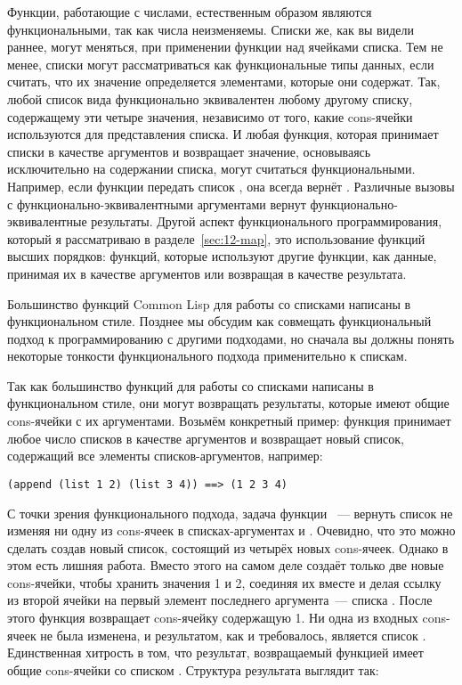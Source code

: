 Функции, работающие с числами, естественным образом являются функциональными, так как числа
неизменяемы. Списки же, как вы видели раннее, могут меняться, при применении функции
 над ячейками списка. Тем не менее, списки могут рассматриваться как
функциональные типы данных, если считать, что их значение определяется элементами, которые
они содержат. Так, любой список вида  функционально эквивалентен любому
другому списку, содержащему эти четыре значения, независимо от того, какие cons-ячейки
используются для представления списка. И любая функция, которая принимает списки в
качестве аргументов и возвращает значение, основываясь исключительно на содержании списка,
могут считаться функциональными. Например, если функции  передать список
, она всегда вернёт . Различные вызовы  с
функционально-эквивалентными аргументами вернут функционально-эквивалентные
результаты. Другой аспект функционального программирования, который я рассматриваю в
разделе~\ref{sec:12-map}, это использование функций высших порядков: функций, которые
используют другие функции, как данные, принимая их в качестве аргументов или возвращая в
качестве результата.

Большинство функций Common Lisp для работы со списками написаны в функциональном
стиле. Позднее мы обсудим как совмещать функциональный подход к программированию с другими
подходами, но сначала вы должны понять некоторые тонкости функционального подхода
применительно к спискам.

Так как большинство функций для работы со списками написаны в функциональном стиле, они могут
возвращать результаты, которые имеют общие cons-ячейки с их аргументами. Возьмём
конкретный пример: функция  принимает любое число списков в качестве
аргументов и возвращает новый список, содержащий все элементы списков-аргументов,
например:

\begin{lstlisting}
(append (list 1 2) (list 3 4)) ==> (1 2 3 4)
\end{lstlisting}

С точки зрения функционального подхода, задача функции ~--- вернуть список
 не изменяя ни одну из cons-ячеек в списках-аргументах  и
. Очевидно, что это можно сделать создав новый список, состоящий из четырёх
новых cons-ячеек. Однако в этом есть лишняя работа. Вместо этого  на самом
деле создаёт только две новые cons-ячейки, чтобы хранить значения 1 и 2, соединяя их
вместе и делая ссылку из  второй ячейки на первый элемент последнего аргумента~---
списка . После этого функция возвращает cons-ячейку содержащую 1. Ни одна из
входных cons-ячеек не была изменена, и результатом, как и требовалось, является список
. Единственная хитрость в том, что результат, возвращаемый функцией
 имеет общие cons-ячейки со списком . Структура результата
выглядит так:

